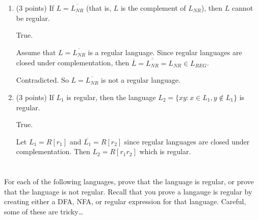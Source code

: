 \documentclass[paper=a4, fontsize=11pt]{scrartcl} %
\begin{document}
\begin{enumerate}
\item
  \begin{fancyquotes}
    (3 points) If $L = \overline{L_{NR}}$ (that is, $L$ is the complement of $L_{NR}$),
    then $L$ cannot be regular.
  \end{fancyquotes}

  True.

  Assume that $L = \overline{L_{NR}}$ is a regular language.
  Since regular languages are closed under complementation, then
  $\overline{L} = \overline{\overline{L_{NR}}} = L_{NR} \in L_{REG}$.

  Contradicted. So $L = \overline{L_{NR}}$ is not a regular language.

\item
  \begin{fancyquotes}
    (3 points) If $L_1$ is regular, then the language $L_2 = \{xy :
    x\in L_1, y \not\in L_1\}$ is regular.
  \end{fancyquotes}

  True.

  Let $L_1 = R[r_1]$ and $\overline{L_1} = R[r_2]$ since regular
  languages are closed under complementation.
  Then $L_2 = R[r_1r_2]$ which is regular.
\end{enumerate}

\pagebreak

\section{}

\begin{fancyquotes}
  For each of the following languages, prove that the language is
  regular, or prove that the language is not regular. Recall that you
  prove a langauge is regular by creating either a DFA, NFA, or
  regular expression for that language. Careful, some of these are
  tricky\dots
\end{fancyquotes}
\end{document}

